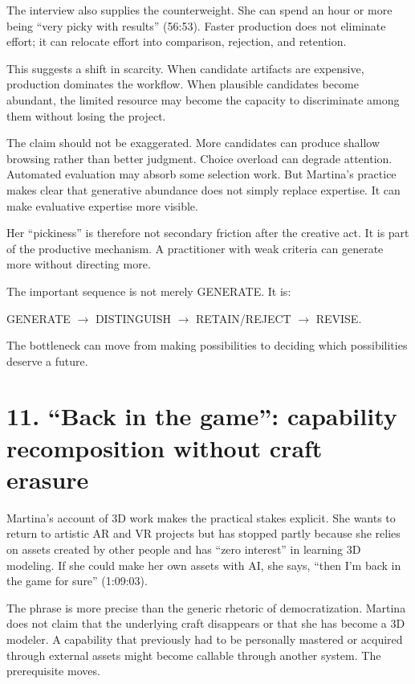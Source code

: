 \documentclass[
  11pt,
  letterpaper,
]{article}
\begin{document}
The interview also supplies the counterweight. She can spend an hour or
more being ``very picky with results'' (56:53). Faster production does
not eliminate effort; it can relocate effort into comparison, rejection,
and retention.

This suggests a shift in scarcity. When candidate artifacts are
expensive, production dominates the workflow. When plausible candidates
become abundant, the limited resource may become the capacity to
discriminate among them without losing the project.

The claim should not be exaggerated. More candidates can produce shallow
browsing rather than better judgment. Choice overload can degrade
attention. Automated evaluation may absorb some selection work. But
Martina's practice makes clear that generative abundance does not simply
replace expertise. It can make evaluative expertise more visible.

Her ``pickiness'' is therefore not secondary friction after the creative
act. It is part of the productive mechanism. A practitioner with weak
criteria can generate more without directing more.

The important sequence is not merely GENERATE. It is:

\begin{center}
GENERATE $\rightarrow$ DISTINGUISH $\rightarrow$ RETAIN/REJECT $\rightarrow$ REVISE.
\end{center}

The bottleneck can move from making possibilities to deciding which
possibilities deserve a future.

\section{11. ``Back in the game'': capability recomposition without
craft
erasure}\label{back-in-the-game-capability-recomposition-without-craft-erasure}

Martina's account of 3D work makes the practical stakes explicit. She
wants to return to artistic AR and VR projects but has stopped partly
because she relies on assets created by other people and has ``zero
interest'' in learning 3D modeling. If she could make her own assets
with AI, she says, ``then I'm back in the game for sure'' (1:09:03).

The phrase is more precise than the generic rhetoric of democratization.
Martina does not claim that the underlying craft disappears or that she
has become a 3D modeler. A capability that previously had to be
personally mastered or acquired through external assets might become
callable through another system. The prerequisite moves.
\end{document}

